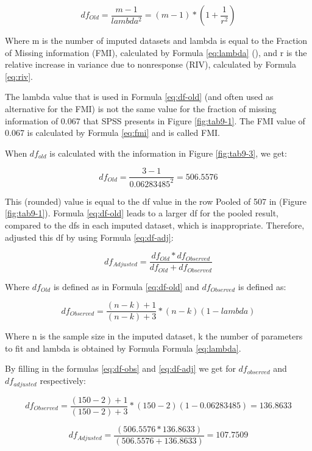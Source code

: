 \documentclass[
]{book}
\begin{document}
\begin{equation}
df_{Old} = \frac{m-1}{lambda^2} = (m-1) * (1 + \frac{1}{r^2})
  \label{eq:df-old}
\end{equation}

Where m is the number of imputed datasets and lambda is equal to the Fraction of Missing information (FMI), calculated by Formula \eqref{eq:lambda} (\citet{raghunathan2016}), and r is the relative increase in variance due to nonresponse (RIV), calculated by Formula \eqref{eq:riv}.

The lambda value that is used in Formula \eqref{eq:df-old} (and often used as alternative for the FMI) is not the same value for the fraction of missing information of 0.067 that SPSS presents in Figure \ref{fig:tab9-1}. The FMI value of 0.067 is calculated by Formula \eqref{eq:fmi} and is called FMI.

When \(df_{old}\) is calculated with the information in Figure \ref{fig:tab9-3}, we get:

\[df_{Old} = \frac{3-1}{0.06283485^2} = 506.5576\]

This (rounded) value is equal to the df value in the row Pooled of 507 in (Figure \ref{fig:tab9-1}). Formula \eqref{eq:df-old} leads to a larger df for the pooled result, compared to the dfs in each imputed dataset, which is inappropriate. Therefore, \citet{BARNARD1999} adjusted this df by using Formula \eqref{eq:df-adj}:

\begin{equation}
df_{Adjusted} = \frac{df_{Old}*{df_{Observed}}}{df_{Old}+{df_{Observed}}}
  \label{eq:df-adj}
\end{equation}

Where \(df_{Old}\) is defined as in Formula \eqref{eq:df-old} and \(df_{Observed}\) is defined as:

\begin{equation}
df_{Observed} = \frac{(n-k)+1}{(n-k)+3}*(n-k)(1-lambda)
  \label{eq:df-obs}
\end{equation}

Where n is the sample size in the imputed dataset, k the number of parameters to fit and lambda is obtained by Formula Formula \eqref{eq:lambda}.

By filling in the formulas \eqref{eq:df-obs} and \eqref{eq:df-adj} we get for \(df_{observed}\) and \(df_{adjusted}\) respectively:

\[df_{Observed} = \frac{(150-2)+1}{(150-2)+3}*(150-2)(1- 0.06283485)=136.8633\]

\[df_{Adjusted} = \frac{(506.5576* 136.8633)}{(506.5576+ 136.8633)}=107.7509\]
\end{document}
